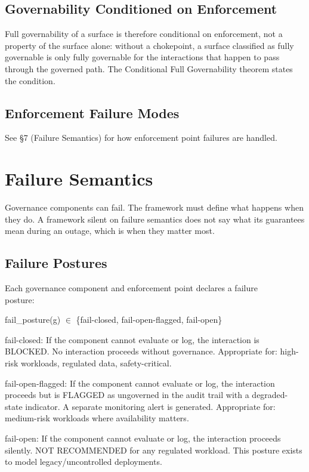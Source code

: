 \subsection{Governability Conditioned on Enforcement}


Full governability of a surface is therefore conditional on enforcement, not a
property of the surface alone: without a chokepoint, a surface classified as fully
governable is only fully governable for the interactions that happen to pass
through the governed path. The Conditional Full Governability theorem states the
condition.


\subsection{Enforcement Failure Modes}


See \S{}7 (Failure Semantics) for how enforcement point failures are handled.



\section{Failure Semantics}
\label{sec:framework-7}


Governance components can fail. The framework must define what happens when they do. A framework silent on failure semantics does not say what its guarantees mean during an outage, which is when they matter most.

\subsection{Failure Postures}


\begin{cdef}
\begin{claddisp}
Each governance component and enforcement point declares a failure\\
posture:\\
\end{claddisp}
fail\_\allowbreak{}posture(g) $\in$ \{fail-closed, fail-open-flagged, fail-open\}

fail-closed: If the component cannot evaluate or log, the interaction is BLOCKED. No interaction proceeds without governance. Appropriate for: high-risk workloads, regulated data, safety-critical.

fail-open-flagged: If the component cannot evaluate or log, the interaction proceeds but is FLAGGED as ungoverned in the audit trail with a degraded- state indicator. A separate monitoring alert is generated. Appropriate for: medium-risk workloads where availability matters.

fail-open: If the component cannot evaluate or log, the interaction proceeds silently. NOT RECOMMENDED for any regulated workload. This posture exists to model legacy/uncontrolled deployments.

\end{cdef}


